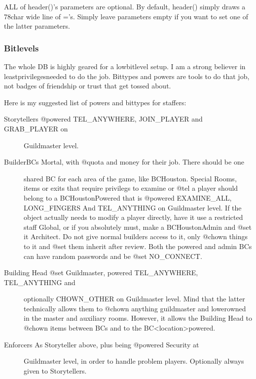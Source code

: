 \documentclass[letterpaper,10pt,english]{sphinxmanual}
\begin{document}
\begin{itemize}
\sphinxAtStartPar
ALL of header()’s parameters are optional. By default, header() simply draws
a 78\sphinxhyphen{}char wide line of =’s. Simply leave parameters empty if you want to set
one of the latter parameters.

\end{itemize}


\subsubsection{Bitlevels}
\label{\detokenize{gettingstarted:bitlevels}}
\sphinxAtStartPar
The whole DB is highly geared for a low\sphinxhyphen{}bitlevel setup.
I am a strong believer in least\sphinxhyphen{}privileges\sphinxhyphen{}needed to do the job. Bittypes and
powers are tools to do that job, not badges of friendship or trust that get
tossed about.

\sphinxAtStartPar
Here is my suggested list of powers and bittypes for staffers:
\begin{description}
\item[{Storytellers  \sphinxhyphen{} @powered TEL\_ANYWHERE, JOIN\_PLAYER and GRAB\_PLAYER on}] \leavevmode
\sphinxAtStartPar
Guildmaster level.

\item[{Builder\sphinxhyphen{}BCs   \sphinxhyphen{} Mortal, with @quota and money for their job. There should be one}] \leavevmode
\sphinxAtStartPar
shared BC for each area of the game, like BC\sphinxhyphen{}Houston. Special
Rooms, items or exits that require privilegs to examine or @tel
a player should belong to a BC\sphinxhyphen{}Houston\sphinxhyphen{}Powered that is @powered
EXAMINE\_ALL, LONG\_FINGERS And TEL\_ANYTHING on Guildmaster level.
If the object actually needs to modify a player directly, have
it use a restricted staff Global, or if you absolutely must,
make a BC\sphinxhyphen{}Houston\sphinxhyphen{}Admin and @set it Architect. Do not give
normal builders access to it, only @chown things to it and @set
them inherit after review.
Both the \sphinxhyphen{}powered and \sphinxhyphen{}admin BCs can have random passwords and
be @set NO\_CONNECT.

\item[{Building Head \sphinxhyphen{} @set Guildmaster, powered TEL\_ANYWHERE, TEL\_ANYTHING and}] \leavevmode
\sphinxAtStartPar
optionally CHOWN\_OTHER on Guildmaster level. Mind that the
latter technically allows them to @chown anything guildmaster\sphinxhyphen{}
and lower\sphinxhyphen{}owned in the master and auxiliary rooms. However,
it allows the Building Head to @chown items between BCs\sphinxhyphen{} and
to the BC\sphinxhyphen{}\textless{}location\textgreater{}\sphinxhyphen{}powered.

\item[{Enforcers     \sphinxhyphen{} As Storyteller above, plus being @powered Security at}] \leavevmode
\sphinxAtStartPar
Guildmaster level, in order to handle problem players.
Optionally always given to Storytellers.

\end{description}
\end{document}
